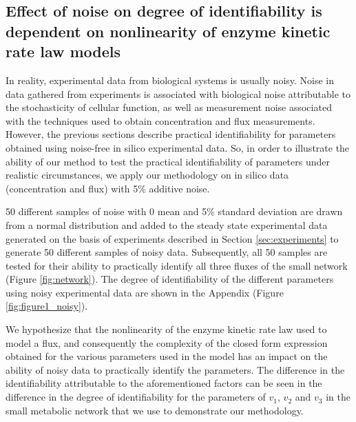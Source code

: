\documentclass[10pt]{article}
\begin{document}
\subsection{Effect of noise on degree of identifiability is dependent on nonlinearity of enzyme kinetic rate law models}\label{sec:noise}
In reality, experimental data from biological systems is usually noisy. Noise in data gathered from experiments is associated with biological noise attributable to the stochasticity of cellular function, as well as measurement noise associated with the techniques used to obtain concentration and flux measurements. However, the previous sections describe practical identifiability for parameters obtained using noise-free in silico experimental data. So, in order to illustrate the ability of our method to test the practical identifiability of parameters under realistic circumstances, we apply our methodology on in silico data (concentration and flux) with 5\% additive noise. 

50 different samples of noise with 0 mean and 5\% standard deviation are drawn from a normal distribution and added to the steady state experimental data generated on the basis of experiments described in Section \ref{sec:experiments} to generate 50 different samples of noisy data. Subsequently, all 50 samples are tested for their ability to practically identify all three fluxes of the small network (Figure \ref{fig:network}). The degree of identifiability of the different parameters using noisy experimental data are shown in the Appendix (Figure \ref{fig:figure1_noisy}). 

We hypothesize that the nonlinearity of the enzyme kinetic rate law used to model a flux, and consequently the complexity of the closed form expression obtained for the various parameters used in the model has an impact on the ability of noisy data to practically identify the parameters. The difference in the identifiability attributable to the aforementioned factors can be seen in the difference in the degree of identifiability for the parameters of $v_1$, $v_2$ and $v_3$ in the small metabolic network that we use to demonstrate our methodology. 
\end{document}
